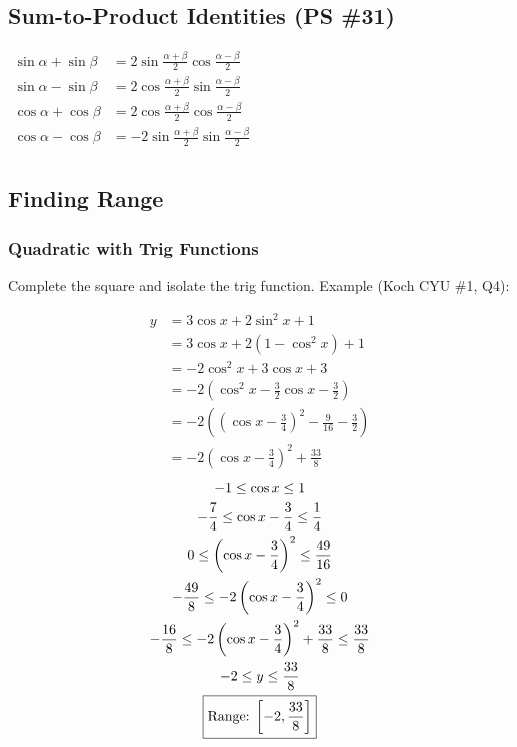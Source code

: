 \documentclass{article}
\begin{document}
\subsection{Sum-to-Product Identities (PS \#31)}
\begin{center}
\hyperref[proof:s2p]{
	$\begin{aligned}
		\sin\alpha+\sin\beta&=
		2\sin\frac{\alpha+\beta}{2}\cos\frac{\alpha-\beta}{2} \\
		\sin\alpha-\sin\beta&=
		2\cos\frac{\alpha+\beta}{2}\sin\frac{\alpha-\beta}{2} \\
		\cos\alpha+\cos\beta&=
		2\cos\frac{\alpha+\beta}{2}\cos\frac{\alpha-\beta}{2} \\
		\cos\alpha-\cos\beta&=
		-2\sin\frac{\alpha+\beta}{2}\sin\frac{\alpha-\beta}{2} \\
	\end{aligned}$
}
\end{center}

\pagebreak

\subsection{Finding Range}
\subsubsection{Quadratic with Trig Functions}
Complete the square and isolate the trig function. Example (Koch CYU \#1, Q4):
\begin{multicols}{2}
	\begin{align*}
		y&=3\cos x+2\sin^2x+1 \\
		&=3\cos x+2\left(1-\cos^2x\right)+1 \\
		&=-2\cos^2x+3\cos x+3 \\
		&=-2\left(\cos^2x-\frac{3}{2}\cos x-\frac{3}{2}\right) \\
		&=-2\left(\left(\cos x-\frac{3}{4}\right)^2-\frac{9}{16}-\frac{3}{2}\right) \\
		&=-2\left(\cos x-\frac{3}{4}\right)^2+\frac{33}{8}
	\end{align*}
	\begin{gather*}
		-1\leq\cos x\leq1 \\
		-\frac{7}{4}\leq\cos x-\frac{3}{4}\leq\frac{1}{4} \\
		0\leq\left(\cos x-\frac{3}{4}\right)^2\leq\frac{49}{16} \\
		-\frac{49}{8}\leq-2\left(\cos x-\frac{3}{4}\right)^2\leq0 \\
		-\frac{16}{8}\leq-2\left(\cos x-\frac{3}{4}\right)^2+\frac{33}{8}\leq\frac{33}{8} \\
		-2\leq y\leq\frac{33}{8} \\
		\boxed{\text{Range: $\interval[scaled]{-2}{\frac{33}{8}}$}}
	\end{gather*}
\end{multicols}
\end{document}
